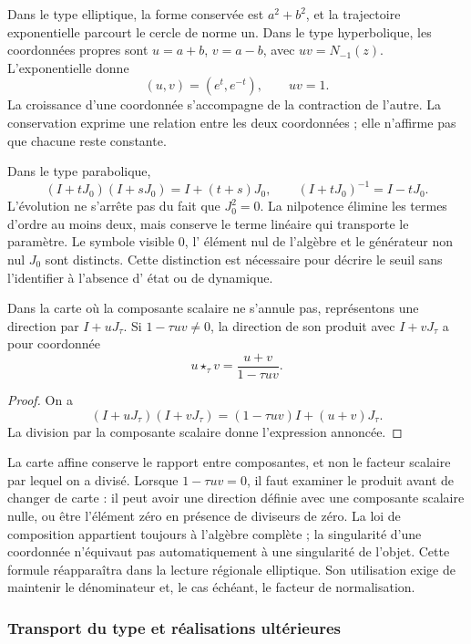 Dans le type elliptique, la forme conservée est \(a^2+b^2\), et la trajectoire exponentielle parcourt le cercle de norme un. Dans le type hyperbolique, les coordonnées propres sont \(u=a+b\), \(v=a-b\), avec \(uv=N_{-1}(z)\). L'exponentielle donne
\[
 (u,v)=(e^t,e^{-t}),\qquad uv=1.
\]
La croissance d'une coordonnée s'accompagne de la contraction de l'autre.
La conservation exprime une relation entre les deux coordonnées ; elle n'affirme pas que
chacune reste constante.

Dans le type parabolique,
\[
 (I+tJ_0)(I+sJ_0)=I+(t+s)J_0,\qquad
 (I+tJ_0)^{-1}=I-tJ_0.
\]
L'évolution ne s'arrête pas du fait que \(J_0^2=0\). La nilpotence élimine les
termes d'ordre au moins deux, mais conserve le terme linéaire qui
transporte le paramètre. Le symbole visible \(0\), l'
élément nul de l'algèbre et le générateur non nul \(J_0\) sont distincts. Cette distinction
est nécessaire pour décrire le seuil sans l'identifier à l'absence d'
état ou de dynamique.

\begin{proposition}
\label{x_reciprocidad:trit-ampl-prop-pendientes}
Dans la carte où la composante scalaire ne s'annule pas, représentons une
direction par \(I+uJ_\tau\). Si \(1-\tau uv\ne0\), la direction de son
produit avec \(I+vJ_\tau\) a pour coordonnée
\[
 u\star_\tau v=\frac{u+v}{1-\tau uv}.
\]
\end{proposition}
\begin{proof}
On a
\[
 (I+uJ_\tau)(I+vJ_\tau)
   =(1-\tau uv)I+(u+v)J_\tau.
\]
La division par la composante scalaire donne l'expression annoncée.
\end{proof}

La carte affine conserve le rapport entre composantes, et non le facteur scalaire par lequel on a divisé. Lorsque \(1-\tau uv=0\), il faut examiner le produit avant de changer de carte : il peut avoir une direction définie avec une composante scalaire nulle, ou être l'élément zéro en présence de diviseurs de zéro. La loi de composition appartient toujours à l'algèbre complète ; la singularité d'une coordonnée n'équivaut pas automatiquement à une singularité de l'objet. Cette formule réapparaîtra dans la lecture régionale elliptique. Son utilisation exige de maintenir le dénominateur et, le cas échéant, le facteur de normalisation.

\subsubsection{Transport du type et réalisations ultérieures}
\label{x_reciprocidad:trit-ampl-puentes}

